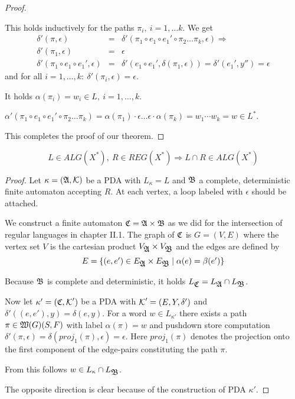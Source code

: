 \begin{proof}
\begin{enumerate}
  This holds inductively for the paths $\pi_i,\ i = 1, \ldots k$. We get
  \begin{eqnarray*}
  \delta'(\pi, \epsilon) &=& \delta'(\pi_1 \circ e_1 \circ e_1' \circ \pi_2
  \ldots \pi_k, \epsilon) \Rightarrow \\
  \delta'(\pi_1, \epsilon) &=& \epsilon \\
  \delta'(\pi_1 \circ e_1 \circ e_1', \epsilon) &=& \delta'(e_1 \circ e_1',
  \delta(\pi_1, \epsilon)) = \delta'(e_1', y'') = \epsilon
  \end{eqnarray*}
  and for all $i = 1, \ldots, k:\ \delta'(\pi_i, \epsilon) = \epsilon$. 
  
  It holds $\alpha(\pi_i) = w_i \in L,\ i = 1, \ldots, k$.
  
  $\alpha'(\pi_1 \circ e_1 \circ e_1' \circ \pi_2 \ldots \pi_k) = \alpha(\pi_1)
  \cdot \epsilon \ldots \epsilon \cdot \alpha(\pi_k) = w_1 \cdots w_k = w \in
  L^*$.
\end{enumerate}

This completes the proof of our theorem.
\end{proof}

\bigskip
\begin{theorem}
\label{alg-lang-closure-reg-intersect}
\[ L \in ALG(X^*),\ R \in REG(X^*)\Rightarrow L \cap R \in ALG(X^*) \]
\end{theorem}

\begin{proof}
Let $\kappa = (\mbox{$\mathfrak{A}$}, \mbox{$\mathcal{K}$})$ be a PDA with $L_{\kappa} = L$ and $\mbox{$\mathfrak{B}$}$
a complete, deterministic finite automaton accepting $R$. At each vertex, a loop
labeled with $\epsilon$ should be attached.

We construct a finite automaton $\mbox{$\mathfrak{C}$} = \mbox{$\mathfrak{A}$} \times \mbox{$\mathfrak{B}$}$ as we did for
the intersection of regular languages in chapter II.1. The graph of $\mbox{$\mathfrak{C}$}$ is
$G = (V, E)$ where the vertex set $V$ is the cartesian product $V_{\mbox{$\mathfrak{A}$}}
\times V_{\mbox{$\mathfrak{B}$}}$ and the edges are defined by
\[ E = \mbox{$\{(e, e') \in E_{\mbox{$\mathfrak{A}$}} \times E_{\mbox{$\mathfrak{B}$}} \mid \alpha(e) =
\beta(e') \}$} \]

Because $\mbox{$\mathfrak{B}$}$ is complete and deterministic, it holds $L_{\mbox{$\mathfrak{C}$}} =
L_{\mbox{$\mathfrak{A}$}} \cap L_{\mbox{$\mathfrak{B}$}}$.

Now let $\kappa' = (\mbox{$\mathfrak{C}$}, \mbox{$\mathcal{K}$}')$ be a PDA with $\mbox{$\mathcal{K}$}' = (E,
Y, \delta')$ and $\delta'((e, e'), y) = \delta(e, y)$.
For a word $w \in L_{\kappa'}$ there exists a path $\pi \in
\mbox{$\mathfrak{W}(G)$}(S, F)$ with label $\alpha(\pi) = w$ and pushdown store
computation $\delta'(\pi, \epsilon) = \delta(proj_1(\pi), \epsilon) = \epsilon$.
Here $proj_1(\pi)$ denotes the projection onto the first component of the
edge-pairs constituting the path $\pi$.

From this follows $w \in L_{\kappa} \cap L_{\mbox{$\mathfrak{B}$}}$.

The opposite direction is clear because of the construction of PDA $\kappa'$.
\end{proof}

